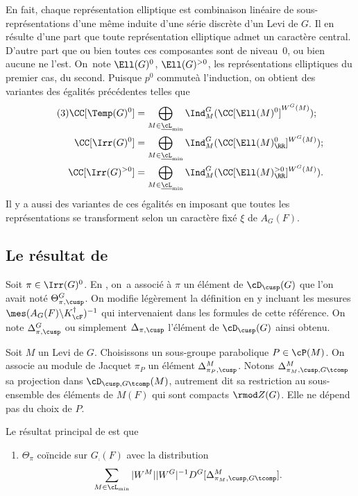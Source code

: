 En fait, chaque représentation elliptique est combinaison linéaire de sous-repré\-sen\-tations d'une même induite d'une série discrète d'un Levi de $G$. Il en résulte d'une part que toute représentation elliptique admet un caractère central. D'autre part que ou bien toutes ces composantes sont de niveau~$0$, ou bien aucune ne l'est. On~note $\Ell(G)^0$, \resp $\Ell(G)^{>0}$, les représentations elliptiques du premier cas, \resp du second. Puisque $p^0$ \og commute\fg à l'induction, on obtient des variantes des égalités précédentes telles que
\begin{align*}\tag{3}\label{representationselliptiques3}
\CC[\Temp(G)^0]&=\bigoplus_{M\in\underline{\cL}_{\min}}\Ind_{M}^G(\CC[\Ell(M)^0]^{W^G(M)});\\\CC[\Irr(G)^0]&=\bigoplus_{M\in\underline{\cL}_{\min}}\Ind_{M}^G(\CC[\Ell(M)^0_{\RR}]^{W^G(M)});\\
\CC[\Irr(G)^{>0}]&=\bigoplus_{M\in\underline{\cL}_{\min}}\Ind_{M}^G(\CC[\Ell(M)_{\RR}^{>0}]^{W^G(M)}).
\end{align*}
Il y a aussi des variantes de ces égalités en imposant que toutes les représentations se transforment selon un caractère fixé $\xi$ de $A_{G}(F)$.

\subsection{Le résultat de \texorpdfstring{\cite{W2}}{W2}}\label{leresultat}

Soit $\pi\in \Irr(G)^0$. En \cite{W2}, on~a associé à $\pi$ un élément de $ \cD_{\cusp}(G)$ que l'on avait noté $\Theta^G_{\pi,\cusp}$. On modifie légèrement la définition en y incluant les mesures $\mes(A_{G}(F)\backslash K_{\cF}^{\dag})^{-1}$ qui intervenaient dans les formules de cette référence. On note $\Delta^G_{\pi,\cusp}$ ou simplement $\Delta_{\pi,\cusp}$ l'élément de $\cD_{\cusp}(G)$ ainsi obtenu.

Soit $M$ un Levi de $G$. Choisissons un sous-groupe parabolique $P\in \cP(M)$. On associe au module de Jacquet $\pi_{P}$ un élément $\Delta^M_{\pi_{P},\cusp}$. Notons $\Delta^M_{\pi_{M},\cusp,G\tcomp}$ sa projection dans $\cD_{\cusp,G\tcomp}(M)$, autrement dit sa restriction au sous-ensemble des éléments de $M(F)$ qui sont compacts $\rmod Z(G)$. Elle ne dépend pas du choix de $P$.

Le résultat principal de \cite{W2} est que
\begin{enumerate}
\item\label{leresultat1}
$\Theta_{\pi}$ coïncide sur $G_{\comp}(F)$ avec la distribution
\[
\sum_{M\in \cL_{\min}}\vert W^M\vert \vert W^G\vert ^{-1}D^G[\Delta^M_{\pi_{M},\cusp,G\tcomp}].
\]
\end{enumerate}

